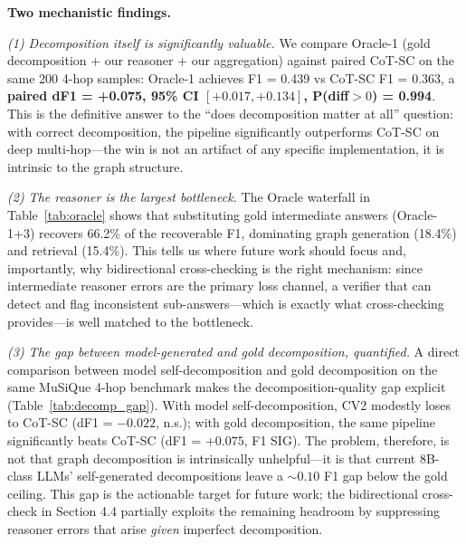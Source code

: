 \documentclass[11pt,a4paper]{article}
\begin{document}
\textbf{Two mechanistic findings.}

\emph{(1) Decomposition itself is significantly valuable.} We compare Oracle-1 (gold decomposition + our reasoner + our aggregation) against paired CoT-SC on the same 200 4-hop samples: Oracle-1 achieves F1 = 0.439 vs CoT-SC F1 = 0.363, a \textbf{paired dF1 = +0.075, 95\% CI $[+0.017, +0.134]$, P(diff${>}0$) = 0.994}. This is the definitive answer to the ``does decomposition matter at all'' question: with correct decomposition, the pipeline significantly outperforms CoT-SC on deep multi-hop---the win is not an artifact of any specific implementation, it is intrinsic to the graph structure.

\emph{(2) The reasoner is the largest bottleneck.} The Oracle waterfall in Table~\ref{tab:oracle} shows that substituting gold intermediate answers (Oracle-1+3) recovers 66.2\% of the recoverable F1, dominating graph generation (18.4\%) and retrieval (15.4\%). This tells us where future work should focus and, importantly, why bidirectional cross-checking is the right mechanism: since intermediate reasoner errors are the primary loss channel, a verifier that can detect and flag inconsistent sub-answers---which is exactly what cross-checking provides---is well matched to the bottleneck.

\emph{(3) The gap between model-generated and gold decomposition, quantified.} A direct comparison between model self-decomposition and gold decomposition on the same MuSiQue 4-hop benchmark makes the decomposition-quality gap explicit (Table~\ref{tab:decomp_gap}). With model self-decomposition, CV2 modestly loses to CoT-SC (dF1 = $-0.022$, n.s.); with gold decomposition, the same pipeline significantly beats CoT-SC (dF1 = $+0.075$, F1 SIG). The problem, therefore, is not that graph decomposition is intrinsically unhelpful---it is that current 8B-class LLMs' self-generated decompositions leave a ${\sim}0.10$ F1 gap below the gold ceiling. This gap is the actionable target for future work; the bidirectional cross-check in Section 4.4 partially exploits the remaining headroom by suppressing reasoner errors that arise \emph{given} imperfect decomposition.

\begin{table}[h]
\centering
\caption{Model-generated vs.\ gold decomposition on MuSiQue 4-hop (Qwen3-8B, full context, paired vs.\ CoT-SC). Same benchmark, same reasoner and aggregation; only the decomposition source changes. The $\sim$0.10 F1 gap between the two rows quantifies the actionable decomposition-quality target.}
\label{tab:decomp_gap}
\end{table}
\end{document}
